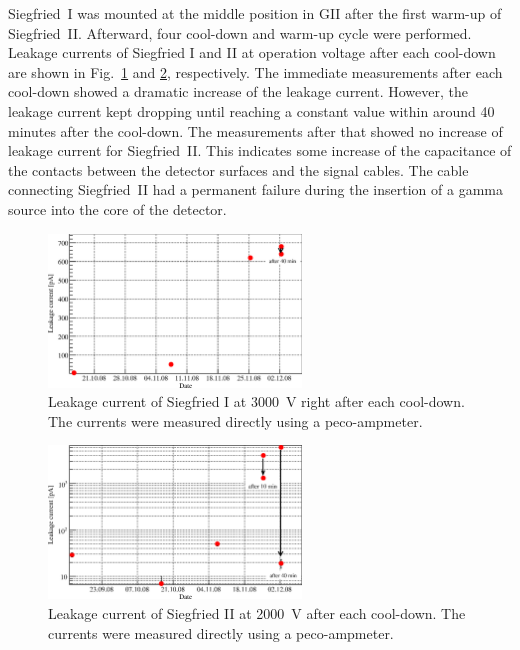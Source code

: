 Siegfried~I was mounted at the middle position in GII after the first warm-up of Siegfried~II. Afterward, four cool-down and warm-up cycle were performed. Leakage currents of Siegfried I and II at operation voltage after each cool-down are shown in Fig.~\ref{fig:ii:lcs1} and \ref{fig:ii:lcs2}, respectively. The immediate measurements after each cool-down showed a dramatic increase of the leakage current. However, the leakage current kept dropping until reaching a constant value within around 40 minutes after the cool-down. The measurements after that showed no increase of leakage current for Siegfried~II. This indicates some increase of the capacitance of the contacts between the detector surfaces and the signal cables. The cable connecting Siegfried~II had a permanent failure during the insertion of a gamma source into the core of the detector.

\begin{figure}[htbp]
\centering
\includegraphics[width=0.6\textwidth]{LCs1}
\caption{Leakage current of Siegfried I at 3000~V right after each cool-down. The currents were measured directly using a peco-ampmeter.}
\label{fig:ii:lcs1}
\end{figure}

\begin{figure}[htbp]
\centering
\includegraphics[width=0.6\textwidth, clip]{LCs2}
\caption{Leakage current of Siegfried II at 2000~V after each cool-down. The currents were measured directly using a peco-ampmeter.}
\label{fig:ii:lcs2}
\end{figure}

